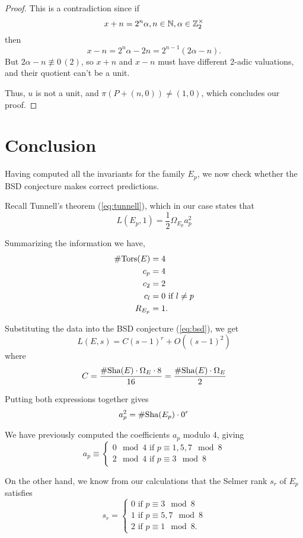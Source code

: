 \documentclass[12pt, a4paper]{amsart}
\begin{document}
\begin{proof}
  This is a contradiction since if
  $$x+n = 2^n\alpha, n \in {\mathbb N}, \alpha \in {\mathbb Z}_2^{\times}$$ then $$x-n = 2^n\alpha - 2n
  = 2^{n-1}(2\alpha-n).$$
  But $2\alpha-n \not\equiv 0 \, (2)$, so $x+n$ and $x-n$ must have different 2-adic
  valuations, and their quotient can't be a unit.

  Thus, $u$ is not a unit, and $\pi(P+(n,0)) \neq (1,0)$, which concludes our proof.
\end{proof}

\section{Conclusion}
Having computed all the invariants for the family $E_p$, we now check whether
the BSD conjecture makes correct predictions.

Recall Tunnell's theorem (\autoref{eq:tunnell}), which in our case states that
\[L(E_p,1) = \frac{1}{2}\Omega_{E_p}a_p^2\]

Summarizing the information we have,
\begin{equation*}
  \begin{split}
    \#{\text{\normalfont Tors}}(E) &= 4 \\
    c_p &= 4 \\
    c_2 &= 2 \\
    c_l &= 0 \text{ if } l \neq p \\
    R_{E_p} &= 1.
  \end{split}
\end{equation*}

Substituting the data into the BSD conjecture (\autoref{eq:bsd}), we get
\[
  L(E,s) = C(s-1)^r + O((s-1)^2)
\]
where
\begin{equation*}
  C = \frac{\# \text{\normalfont Sha}(E) \cdot \Omega_E \cdot 8}{16} = \frac{\#\text{\normalfont Sha}(E)\cdot\Omega_E}{2}
\end{equation*}

Putting both expressions together gives
\begin{equation}
  a_p^2 = \#\text{\normalfont Sha}(E_p)\cdot 0^r
\end{equation}

We have previously computed the coefficients $a_p$ modulo 4, giving
\[a_p \equiv \begin{cases}
    0 \mod{4} \text{ if } p \equiv 1,5,7 \mod{8} \\
    2 \mod{4} \text{ if } p \equiv 3 \mod{8}
  \end{cases}
\]

On the other hand, we know from our calculations that the Selmer rank $s_r$ of
$E_p$ satisfies
  \begin{equation} \label{eq:selmer_rank_p}
    s_r =
    \begin{cases}
      0 \text{ if } p \equiv 3 \mod{8} \\
      1 \text{ if } p \equiv 5,7 \mod{8} \\
      2 \text{ if } p \equiv 1 \mod{8}.
    \end{cases}
  \end{equation}
  
\end{document}
